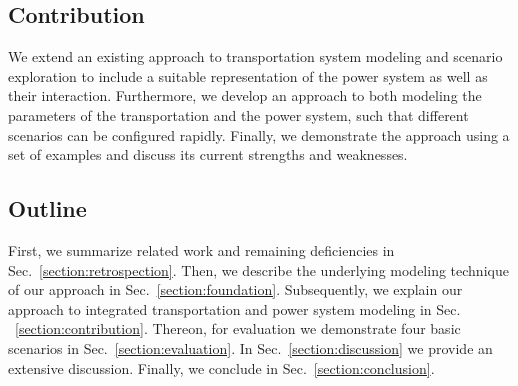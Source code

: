 \subsection{Contribution}

We extend an existing approach to transportation system modeling and scenario exploration to include a suitable representation of the power system as well as their interaction. Furthermore, we develop an approach to both modeling the parameters of the transportation and the power system, such that different scenarios can be configured rapidly. Finally, we demonstrate the approach using a set of examples and discuss its current strengths and weaknesses.

\subsection{Outline}

First, we summarize related work and remaining deficiencies in Sec.~\ref{section:retrospection}. Then, we describe the underlying modeling technique of our approach in Sec.~\ref{section:foundation}. Subsequently, we explain our approach to integrated transportation and power system modeling in Sec. ~\ref{section:contribution}. Thereon, for evaluation we demonstrate four basic scenarios in Sec.~\ref{section:evaluation}. In Sec.~\ref{section:discussion} we provide an extensive discussion. Finally, we conclude in Sec.~\ref{section:conclusion}.